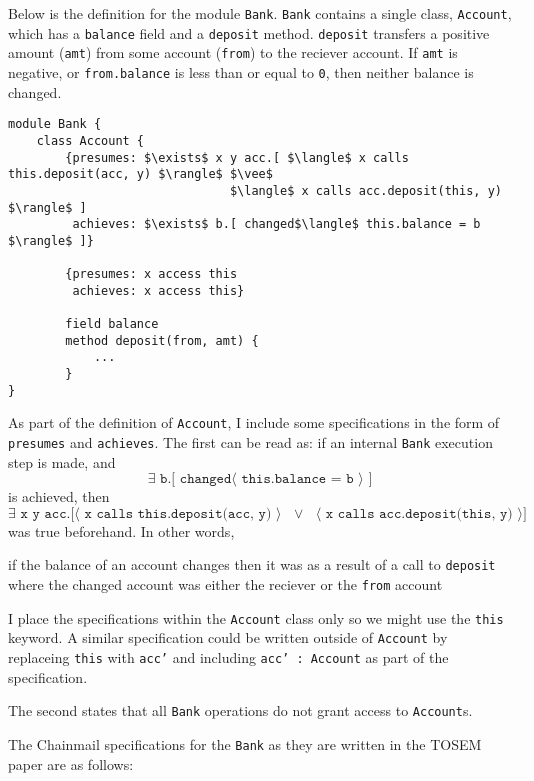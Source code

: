 \documentclass[12pt]{article}
\begin{document}
	
	Below is the definition for the module \texttt{Bank}. \texttt{Bank} contains a single class, \texttt{Account}, which has a 
	\texttt{balance} field and a \texttt{deposit} method. \texttt{deposit} transfers a positive amount (\texttt{amt}) from some 
	account (\texttt{from}) 	to the reciever account. If \texttt{amt} is negative, or \texttt{from.balance} is less than or equal 
	to \texttt{0}, then neither balance is changed.
\begin{lstlisting}[mathescape=true]
module Bank {
	class Account {
		{presumes: $\exists$ x y acc.[ $\langle$ x calls this.deposit(acc, y) $\rangle$ $\vee$ 
							   $\langle$ x calls acc.deposit(this, y) $\rangle$ ]
		 achieves: $\exists$ b.[ changed$\langle$ this.balance = b $\rangle$ ]}
		 
		{presumes: x access this
		 achieves: x access this}
	
		field balance
		method deposit(from, amt) {
			...
		}
}
\end{lstlisting}
	As part of the definition of \texttt{Account}, I include some specifications in the form of \texttt{presumes} and \texttt{achieves}. The first can be
	read as: if an internal \texttt{Bank} execution step is made, and 
	$$\texttt{$\exists$ b.[ changed$\langle$ this.balance = b $\rangle$ ]} $$
	is achieved, then 
	$$\texttt{$\exists$ x y acc.[$\langle$ x calls this.deposit(acc, y) $\rangle$ $\vee$ $\langle$ x calls acc.deposit(this, y) $\rangle$]}$$
	was true beforehand. In other words, 
	\begin{displayquote}
	if the balance of an account changes then it was as a result of a call to \texttt{deposit} where the changed
	account was either the reciever or the \texttt{from} account
	\end{displayquote}
	I place the specifications within the \texttt{Account} class only so we might use the \texttt{this} keyword. A similar specification
	could be written outside of \texttt{Account} by replaceing \texttt{this} with \texttt{acc'} and including \texttt{acc' : Account} as part of the specification.
	
	The second states that all \texttt{Bank} operations do not grant access to \texttt{Account}s.
	
	The Chainmail specifications for the \texttt{Bank} as they are written in the TOSEM paper are as follows:
	
\end{document}
